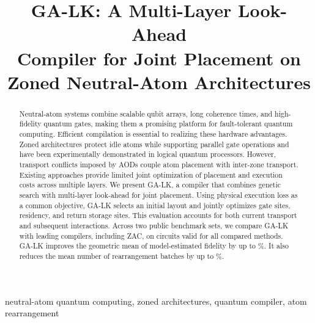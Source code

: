 \documentclass[a4paper,conference]{IEEEtran}
\begin{document}

\title{GA-LK: A Multi-Layer Look-Ahead\\
Compiler for Joint Placement on\\
Zoned Neutral-Atom Architectures}

\author{}

\maketitle

\begin{abstract}
Neutral-atom systems combine scalable qubit arrays, long coherence times, and high-fidelity quantum gates, making them a promising platform for fault-tolerant quantum computing. Efficient compilation is essential to realizing these hardware advantages. Zoned architectures protect idle atoms while supporting parallel gate operations and have been experimentally demonstrated in logical quantum processors. However, transport conflicts imposed by AODs couple atom placement with inter-zone transport. Existing approaches provide limited joint optimization of placement and execution costs across multiple layers. We present GA-LK, a compiler that combines genetic search with multi-layer look-ahead for joint placement. Using physical execution loss as a common objective, GA-LK selects an initial layout and jointly optimizes gate sites, residency, and return storage sites. This evaluation accounts for both current transport and subsequent interactions. Across two public benchmark sets, we compare GA-LK with leading compilers, including ZAC, on circuits valid for all compared methods. GA-LK improves the geometric mean of model-estimated fidelity by up to \GAMainMaxDatasetFidelityGain\%. It also reduces the mean number of rearrangement batches by up to \GAMainMaxDatasetBatchReduction\%.
\end{abstract}

\begin{IEEEkeywords}
neutral-atom quantum computing, zoned architectures, quantum compiler, atom rearrangement
\end{IEEEkeywords}







\flushcolsend
\clearpage
\flushcolsend\flushend


\end{document}
